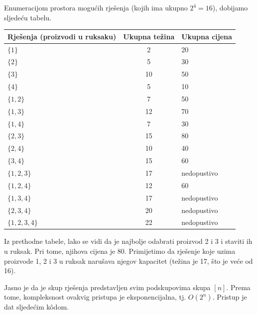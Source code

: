 Enumeracijom prostora mogućih rješenja (kojih ima ukupno $2^4=16$), dobijamo sljedeću tabelu.
\begin{center}
	\begin{tabular}{lcl}
     Rješenja (proizvodi u ruksaku) & Ukupna težina & Ukupna cijena \\ \hline
	$\{1\}$	&   2     &  20 \\
	$\{2\}$ &	5	  &  30 \\
	$\{3\}$ &	10    &  50 \\
 	$\{4\}$ &    5	  &  10 \\
	$\{1,2\}$ &	 7    &  50 \\
	$\{1,3\}$  &  12  &  70 \\
    $\{1,4\}$  &   7  &  30 \\
    $\{2,3\}$  & 15   &  80 \\
    $\{2,4\}$  & 10   &  40 \\
     $\{3,4\}$ & 15   &  60 \\
     $\{1,2,3\}$  &17  & nedopustivo \\
     $\{1,2,4\}$  & 12 & 60 \\
      $\{1,3,4\}$ & 17 & nedopustivo \\
      $\{2,3,4\}$ & 20 & nedopustivo \\
      $\{1,2,3,4\}$ & 22 &  nedopustivo \\ \hline
	\end{tabular}
\end{center}
Iz prethodne tabele, lako se vidi da je najbolje odabrati proizvod 2 i 3 i staviti ih u ruksak. Pri tome, njihova   cijena je 80. Primijetimo da  rješenje koje uzima proizvode 1, 2 i 3 u ruksak narušava njegov kapacitet (težina je 17, što je veće od 16). 

Jasno je da je skup rješenja predstavljen svim podskupovima skupa $[n]$.  Prema tome, kompleksnost ovakvig pristupa je eksponencijalna, tj. $O(2^n)$. Pristup je dat sljedećim  k\^odom. 

